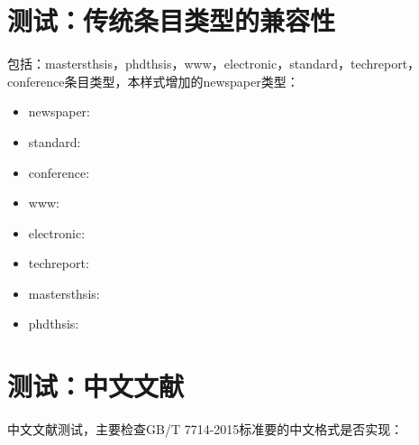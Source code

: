 \documentclass[twoside]{article}
\begin{document}
    \section{测试：传统条目类型的兼容性}
    \begin{refsection}

    包括：mastersthsis，phdthsis，www，electronic，standard，techreport，conference条目类型，本样式增加的newspaper类型：

    \begin{itemize}
      \item newspaper:\cite{张田勤2000--}
      \item standard:\cite{全国文献工作标准化委员会第七分委员会1986--,国家标准局信息分类编码研究所1988-59-92}
      \item conference:\cite{Li2004-21-24}
      \item www:\cite{萧钰2001--}
      \item electronic:\cite{OMG2003--}
      \item techreport:\cite{Humphrey1971--}
      \item mastersthsis:\cite{张志祥1998--}
      \item phdthsis:\cite{张若凌2004--}
    \end{itemize}

    \printbibliography[heading=subbibliography,title=【兼容phdthsis等条目类型】]
\end{refsection}




    \section{测试：中文文献}
    \begin{refsection}
    中文文献测试，主要检查GB/T 7714-2015标准要的中文格式是否实现：

    \cite{中华医学会湖北分会1984--,中国职工教育研究会1985--,abx2007-500-503,张凯军2012-04-05--,张成思2010长期均衡,张伯伟2002--,杨汝岱2015中国制造,杨洪升2013-56-75,杨光2015经济波动,徐伟康2010对,王文甫2010价格粘性,王国静2014金融冲击,汤万金2013-09-30--,马欢2011-27-27, 罗德明2012要素市场扭曲,吕捷2015cpi,楼继伟2016改革,刘凤良2017,李晓西1994转轨过程中的结构性通货膨胀,李强2012-05-03--,雷光春2012--,贾东琴2011-45-52, 韩吉人1985-90-99,国家环境保护局科技标准司1996-2-3,方军雄2007所有制,丁文祥2000--,白书农1998-146-163}

    \printbibliography
    \end{refsection}
\end{document}
